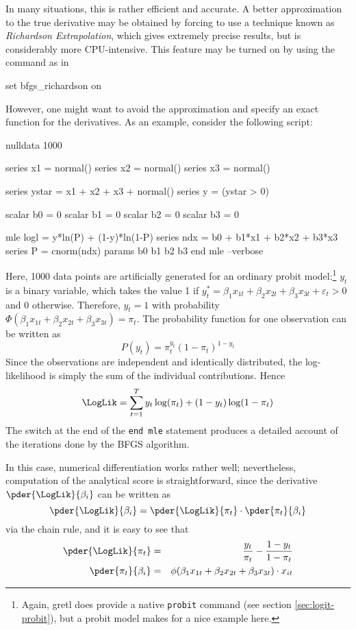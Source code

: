 In many situations, this is rather efficient and accurate. A better
approximation to the true derivative may be obtained by forcing
 to use a technique known as \emph{Richardson Extrapolation},
which gives extremely precise results, but is considerably more
CPU-intensive. This feature may be turned on by using the 
command as in
\begin{code}
  set bfgs_richardson on
\end{code}

However, one might want to avoid the approximation and specify an
exact function for the derivatives. As an example, consider the
following script:
%
\begin{code}
nulldata 1000

series x1 = normal()
series x2 = normal()
series x3 = normal()

series ystar = x1 + x2 + x3 + normal()
series y = (ystar > 0)

scalar b0 = 0
scalar b1 = 0
scalar b2 = 0
scalar b3 = 0

mle logl = y*ln(P) + (1-y)*ln(1-P)
  series ndx = b0 + b1*x1 + b2*x2 + b3*x3
  series P = cnorm(ndx)
  params b0 b1 b2 b3
end mle --verbose
\end{code}

Here, 1000 data points are artificially generated for an ordinary
probit model:\footnote{Again, gretl does provide a native
  \texttt{probit} command (see section \ref{sec:logit-probit}), but a
  probit model makes for a nice example here.} $y_t$ is a binary
variable, which takes the value 1 if $y_t^* = \beta_1 x_{1t} + \beta_2
x_{2t} + \beta_3 x_{3t} + \varepsilon_t > 0$ and 0 otherwise.
Therefore, $y_t = 1$ with probability $\Phi(\beta_1 x_{1t} + \beta_2
x_{2t} + \beta_3 x_{3t}) = \pi_t$.  The probability function for one
observation can be written as
\[
  P(y_t) = \pi_t^{y_t} ( 1 -\pi_t )^{1-y_t}
\]
Since the observations are independent and identically distributed,
the log-likelihood is simply the sum of the individual
contributions. Hence
\[
  \LogLik = \sum_{t=1}^T y_t \log(\pi_t) + (1 - y_t) \log(1 - \pi_t)
\]
The  switch at the end of the \texttt{end mle}
statement produces a detailed account of the iterations done by the
BFGS algorithm.

In this case, numerical differentiation works rather well;
nevertheless, computation of the analytical score is straightforward,
since the derivative $\pder{\LogLik}{\beta_i}$ can be written as
\[
  \pder{\LogLik}{\beta_i} = \pder{\LogLik}{\pi_t} \cdot \pder{\pi_t}{\beta_i}
\]
via the chain rule, and it is easy to see that
\begin{eqnarray*}
  \pder{\LogLik}{\pi_t} & = & \frac{y_t}{\pi_t} - \frac{1 - y_t}{1 -
    \pi_t} \\
  \pder{\pi_t}{\beta_i} & = & \phi(\beta_1 x_{1t} + \beta_2 x_{2t} +
  \beta_3 x_{3t}) \cdot x_{it}
\end{eqnarray*}

